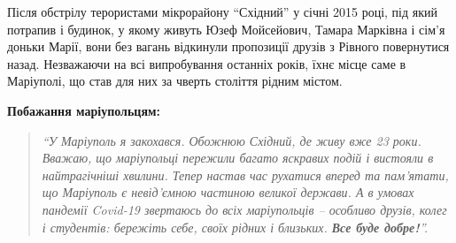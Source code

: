 Після обстрілу терористами мікрорайону \enquote{Східний} у січні 2015 році, під який
потрапив і будинок, у якому живуть Юзеф Мойсейович, Тамара Марківна і сім’я
доньки Марії, вони без вагань відкинули пропозиції друзів з Рівного повернутися
назад. Незважаючи на всі випробування останніх років, їхнє місце саме в
Маріуполі, що став для них за чверть століття рідним містом.

\textbf{Побажання маріупольцям:} 

\begin{quote}
\em\enquote{У Маріуполь я закохався. Обожнюю Східний, де живу вже
23 роки. Вважаю, що маріупольці пережили багато яскравих подій і вистояли в
найтрагічніші хвилини. Тепер настав час рухатися вперед та пам'ятати, що
Маріуполь є невід'ємною частиною великої держави. А в умовах пандемії Covid-19
звертаюсь до всіх маріупольців – особливо друзів, колег і студентів: бережіть
себе, своїх рідних і близьких. \textbf{Все буде добре!}}.
\end{quote}
